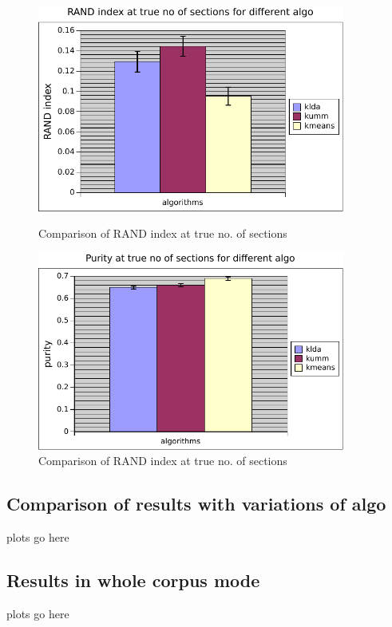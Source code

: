 \begin{figure}
    \centering
    \begin{minipage}{0.45\textwidth}
        \centering
        \includegraphics[width=0.9\textwidth]{rand_k0_comp.pdf}
        \caption{Comparison of RAND index at true no. of sections}
    \end{minipage}\hfill
    \begin{minipage}{0.45\textwidth}
        \centering
        \includegraphics[width=0.9\textwidth]{purity_k0_comp.pdf}
        \caption{Comparison of RAND index at true no. of sections}
    \end{minipage}
\end{figure}

\subsection{Comparison of results with variations of algo} plots go here
\subsection{Results in whole corpus mode} plots go here
